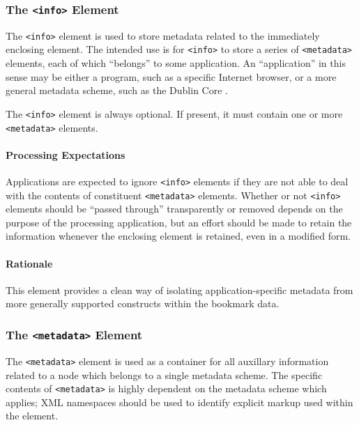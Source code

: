 \documentclass{howto}
\newcommand{\element}[1]{\texttt{<#1>}}
\begin{document}
    \subsubsection{The \element{info} Element
                   \label{element-info}}

      The \element{info} element is used to store metadata related to
      the immediately enclosing element.  The intended use is for
      \element{info} to store a series of \element{metadata} elements,
      each of which ``belongs'' to some application.  An
      ``application'' in this sense may be either a program, such as a
      specific Internet browser, or a more general metadata scheme,
      such as the Dublin Core \cite{dublin-core}.

      The \element{info} element is always optional.  If present, it
      must contain one or more \element{metadata} elements.

      \paragraph*{Processing Expectations}
        Applications are expected to ignore \element{info} elements if
        they are not able to deal with the contents of constituent
        \element{metadata} elements.  Whether or not \element{info}
        elements should be ``passed through'' transparently or removed
        depends on the purpose of the processing application, but an
        effort should be made to retain the information whenever the
        enclosing element is retained, even in a modified form.

      \paragraph*{Rationale}
        This element provides a clean way of isolating
        application-specific metadata from more generally supported
        constructs within the bookmark data.

    \subsubsection{The \element{metadata} Element
                   \label{element-metadata}}

      The \element{metadata} element is used as a container for all
      auxillary information related to a node which belongs to a
      single metadata scheme.  The specific contents of
      \element{metadata} is highly dependent on the metadata scheme
      which applies; XML namespaces should be used to identify
      explicit markup used within the element.
\end{document}
